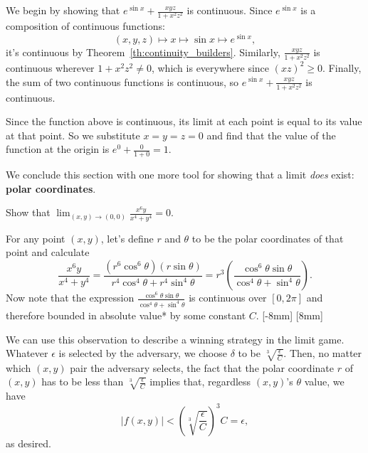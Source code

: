 \documentclass[svgnames]{watsonbook}
\begin{document}
\begin{solution}
  We begin by showing that $e^{\sin x} + \frac{xyz}{1 + x^2 z^2}$ is
    continuous.  Since $e^{\sin x}$ is a composition of continuous
    functions:
  \[
  (x,y,z) \mapsto x \mapsto \sin x \mapsto e^{\sin x}, 
  \]
  it's continuous by Theorem~\ref{th:continuity_builders}. Similarly,
  $\frac{xyz}{1 + x^2 z^2}$ is continuous wherever $1 + x^2 z^2 \neq
  0$, which is everywhere since $(xz)^2 \geq 0$. Finally, the sum of
  two continuous functions is continuous, so $e^{\sin x} +
  \frac{xyz}{1 + x^2 z^2}$ is continuous.

  Since the function above is continuous, its limit at each point is
  equal to its value at that point. So we substitute $x=y=z=0$ and
  find that the value of the function at the origin is
  $e^0 + \frac{0}{1+0} = 1$.
\end{solution}

We conclude this section with one more tool for showing that a limit
\textit{does} exist: \textbf{polar coordinates}.

\begin{example}{}{}
  Show that $\displaystyle{\lim_{(x,y) \to (0,0)}\frac{x^6 y}{x^4 + y^4} = 0}$. 
\end{example}

\begin{solution}
  For any point $(x,y)$, let's define $r$ and $\theta$ to be the polar
  coordinates of that point and calculate
  \[
    \frac{x^6 y}{x^4 + y^4} = \frac{(r^6 \cos^6 \theta) (r\sin \theta)}{r^4
      \cos^4 \theta + r^4\sin^4 \theta} = r^3 \left(\frac{\cos^6\theta \sin
      \theta}{ \cos^4 \theta + \sin^4\theta}\right). 
  \]
  Now note that the expression $\frac{\cos^6\theta \sin
      \theta}{ \cos^4 \theta + \sin^4\theta}$ is continuous over
    $[0,2\pi]$ and therefore bounded in absolute value* by some
    constant $C$. [-8mm]
    [8mm]

    We can use this observation to describe a winning strategy in the
    limit game. Whatever $\epsilon$ is selected by the adversary, we
    choose $\delta$ to be $\sqrt[3]{\frac{\epsilon}{C}}$. Then, 
    no matter which $(x,y)$ pair the adversary selects, the fact that
    the polar coordinate $r$ of $(x,y)$ has to be less than
    $\sqrt[3]{\frac{\epsilon}{C}}$ implies that, regardless $(x,y)$'s
    $\theta$ value, we have 
    \[
      |f(x,y)| <  \left(\sqrt[3]{\frac{\epsilon}{C}}\right)^3 C =
      \epsilon, 
    \]
    as desired. 
  \end{solution}
\end{document}
